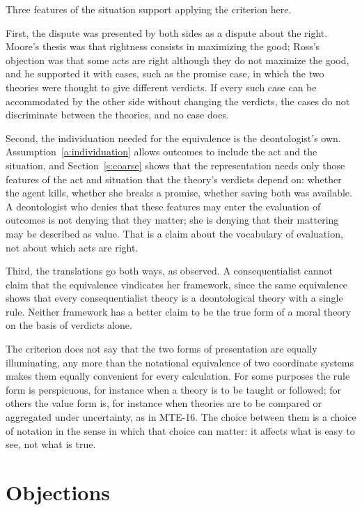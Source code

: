 \documentclass{situationist-preprint}
\begin{document}
Three features of the situation support applying the criterion here.

First, the dispute was presented by both sides as a dispute about the right. Moore's thesis was that rightness consists in maximizing the good; Ross's objection was that some acts are right although they do not maximize the good, and he supported it with cases, such as the promise case, in which the two theories were thought to give different verdicts. If every such case can be accommodated by the other side without changing the verdicts, the cases do not discriminate between the theories, and no case does.

Second, the individuation needed for the equivalence is the deontologist's own. Assumption~\ref{a:individuation} allows outcomes to include the act and the situation, and Section~\ref{s:coarse} shows that the representation needs only those features of the act and situation that the theory's verdicts depend on: whether the agent kills, whether she breaks a promise, whether saving both was available. A deontologist who denies that these features may enter the evaluation of outcomes is not denying that they matter; she is denying that their mattering may be described as value. That is a claim about the vocabulary of evaluation, not about which acts are right.

Third, the translations go both ways, as \citet{Hurley2013} observed. A consequentialist cannot claim that the equivalence vindicates her framework, since the same equivalence shows that every consequentialist theory is a deontological theory with a single rule. Neither framework has a better claim to be the true form of a moral theory on the basis of verdicts alone.

The criterion does not say that the two forms of presentation are equally illuminating, any more than the notational equivalence of two coordinate systems makes them equally convenient for every calculation. For some purposes the rule form is perspicuous, for instance when a theory is to be taught or followed; for others the value form is, for instance when theories are to be compared or aggregated under uncertainty, as in MTE-16. The choice between them is a choice of notation in the sense in which that choice can matter: it affects what is easy to see, not what is true.

\section{Objections}
\end{document}
